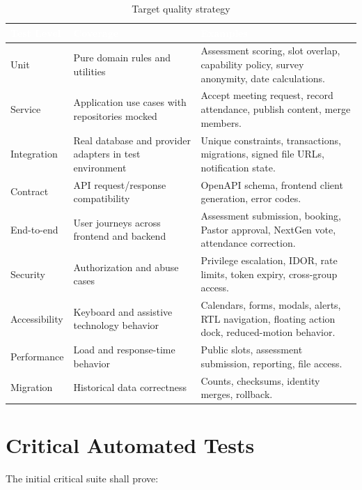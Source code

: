\documentclass[11pt,a4paper,oneside]{report}
\begin{document}
\begin{table}[H]
\centering
{}
\begin{tabularx}{\linewidth}{@{}l X X@{}}
\toprule
\rowcolor{primary}
\textcolor{white}{\textbf{Test Level}} & \textcolor{white}{\textbf{Coverage}} & \textcolor{white}{\textbf{Examples}} \\
\midrule
Unit & Pure domain rules and utilities & Assessment scoring, slot overlap, capability policy, survey anonymity, date calculations. \\
Service & Application use cases with repositories mocked & Accept meeting request, record attendance, publish content, merge members. \\
Integration & Real database and provider adapters in test environment & Unique constraints, transactions, migrations, signed file URLs, notification state. \\
Contract & API request/response compatibility & OpenAPI schema, frontend client generation, error codes. \\
End-to-end & User journeys across frontend and backend & Assessment submission, booking, Pastor approval, NextGen vote, attendance correction. \\
Security & Authorization and abuse cases & Privilege escalation, IDOR, rate limits, token expiry, cross-group access. \\
Accessibility & Keyboard and assistive technology behavior & Calendars, forms, modals, alerts, RTL navigation, floating action dock, reduced-motion behavior. \\
Performance & Load and response-time behavior & Public slots, assessment submission, reporting, file access. \\
Migration & Historical data correctness & Counts, checksums, identity merges, rollback. \\
\bottomrule
\end{tabularx}
\caption{Target quality strategy}
\end{table}

\section{Critical Automated Tests}

The initial critical suite shall prove:
\end{document}
